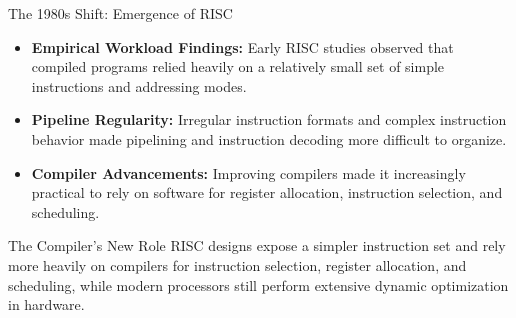 \documentclass[aspectratio=169,11pt,t]{beamer}
\newcommand{\key}[1]{\textbf{#1}}
\begin{document}

\begin{frame}{The 1980s Shift: Emergence of RISC}
\vfill
\begin{itemize}\setlength{\itemsep}{8pt}
  \item \key{Empirical Workload Findings:} Early RISC studies observed that compiled programs relied heavily on a relatively small set of simple instructions and addressing modes.
  \item \key{Pipeline Regularity:} Irregular instruction formats and complex instruction behavior made pipelining and instruction decoding more difficult to organize.
  \item \key{Compiler Advancements:} Improving compilers made it increasingly practical to rely on software for register allocation, instruction selection, and scheduling.
\end{itemize}

\vfill
\begin{block}{The Compiler's New Role}
\small RISC designs expose a simpler instruction set and rely more heavily on compilers for instruction selection, register allocation, and scheduling, while modern processors still perform extensive dynamic optimization in hardware.
\end{block}
\vfill
\end{frame}











\end{document}
